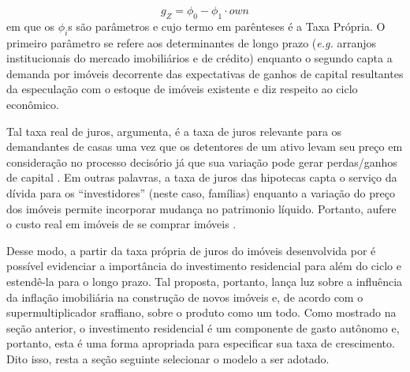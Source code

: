 \begin{equation}
g_Z = \phi_0 - \phi_1\cdot own
\end{equation}
em que os $\phi_i$s são parâmetros e cujo termo em parênteses é a Taxa Própria. 
O primeiro parâmetro se refere aos determinantes de longo prazo (\textit{e.g.} arranjos institucionais do mercado imobiliários e de crédito) enquanto o segundo capta a demanda por imóveis decorrente das expectativas de ganhos de capital resultantes da especulação com o estoque de imóveis existente e diz respeito ao ciclo econômico.

Tal taxa real de juros, argumenta, é a taxa de juros relevante para os demandantes de casas uma vez que os detentores de um ativo levam seu preço em consideração no processo decisório já que sua variação pode gerar perdas/ganhos de capital \cite[p.~144]{teixeira_crescimento_2015}.
Em outras palavras, a taxa de juros das hipotecas capta o serviço da dívida para os ``investidores'' (neste caso, famílias) enquanto a variação do preço dos imóveis permite incorporar mudança no patrimonio líquido. Portanto, aufere o custo real em imóveis de se comprar imóveis \cite[p.~53]{teixeira_crescimento_2015}. 

Desse modo, a partir da taxa própria de juros do imóveis desenvolvida por \textcite{teixeira_crescimento_2015} é possível evidenciar a importância do investimento residencial para além do ciclo e estendê-la para o longo prazo.  
Tal proposta, portanto, lança luz sobre a influência da inflação imobiliária na construção de novos imóveis e, de acordo com o supermultiplicador sraffiano, sobre o produto como um todo. 
Como mostrado na seção anterior, o investimento residencial é um componente de gasto autônomo e, portanto,
esta é uma forma apropriada para especificar sua taxa de crescimento.
Dito isso, resta a seção seguinte selecionar o modelo a ser adotado.




